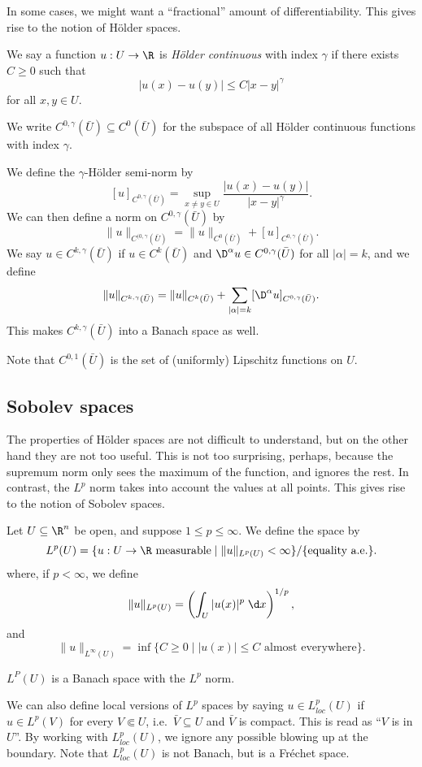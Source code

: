 \documentclass[a4paper]{article}
\begin{document}
In some cases, we might want a ``fractional'' amount of differentiability. This gives rise to the notion of H\"older spaces.
\begin{defi}
  We say a function $u: U \to \R$ is \emph{H\"older continuous} with index $\gamma$ if there exists $C \geq 0$ such that
  \[
    |u(x) - u(y)| \leq C|x - y|^\gamma
  \]
  for all $x, y \in U$.

  We write $C^{0, \gamma}(\bar{U}) \subseteq C^0(\bar{U})$ for the subspace of all H\"older continuous functions with index $\gamma$.

  We define the $\gamma$-H\"older semi-norm by
  \[
    [u]_{C^{0, \gamma}(\bar{U})} = \sup_{x\not= y \in U} \frac{|u(x) - u(y)|}{|x - y|^\gamma}.
  \]
  We can then define a norm on $C^{0, \gamma}(\bar{U})$ by
  \[
    \|u\|_{C^{(0, \gamma}(\bar{U})} = \|u\|_{C^0(\bar{U})} + [u]_{C^{0, \gamma}(\bar{U})}.
  \]
  We say $u \in C^{k, \gamma}(\bar{U})$ if $u \in C^k(\bar{U})$ and $\D^\alpha u \in C^{0, \gamma}(\bar{U})$ for all $|\alpha| = k$, and we define
  \[
    \|u\|_{C^{k, \gamma}(\bar{U})} = \|u\|_{C^k(\bar{U})} + \sum_{|\alpha| = k} [\D^\alpha u]_{C^{0, \gamma}(\bar{U})}.
  \]
  This makes $C^{k, \gamma}(\bar{U})$ into a Banach space as well.
\end{defi}

Note that $C^{0, 1}(\bar{U})$ is the set of (uniformly) Lipschitz functions on $U$.

\subsection{Sobolev spaces}
The properties of H\"older spaces are not difficult to understand, but on the other hand they are not too useful. This is not too surprising, perhaps, because the supremum norm only sees the maximum of the function, and ignores the rest. In contrast, the $L^p$ norm takes into account the values at all points. This gives rise to the notion of Sobolev spaces.

\begin{defi}[$L^p$ space]
  Let $U \subseteq \R^n$ be open, and suppose $1 \leq p \leq \infty$. We define the space  by
  \[
    L^p(U) = \{u: U \to \R\text{ measurable} \mid \|u\|_{L^p(U)} < \infty\}/\{\text{equality a.e.}\}.
  \]
  where, if $p < \infty$, we define
  \[
    \|u\|_{L^p(U)} = \left(\int_U |u(x)|^p\;\d x\right)^{1/p},
  \]
  and
  \[
    \|u\|_{L^\infty(U)} = \inf \{C \geq 0 \mid |u(x)| \leq C\text{ almost everywhere}\}.
  \]
\end{defi}
\begin{thm}
  $L^P(U)$ is a Banach space with the $L^p$ norm.\qedsym
\end{thm}
We can also define local versions of $L^p$ spaces by saying $u \in L^p_{loc}(U)$ if $u \in L^p(V)$ for every $V \Subset U$, i.e.\ $\bar{V} \subseteq U$ and $\bar{V}$ is compact. This is read as ``$V$ is  in $U$''. By working with $L^p_{loc}(U)$, we ignore any possible blowing up at the boundary. Note that $L^p_{loc}(U)$ is not Banach, but is a Fr\'echet space.
\end{document}
